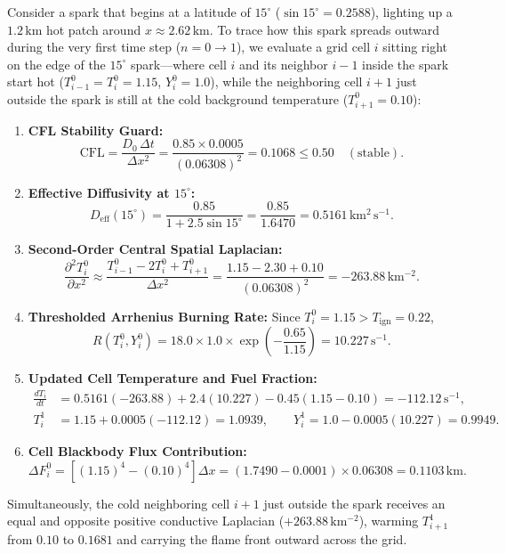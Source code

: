 \documentclass[11pt,a4paper]{article}
\begin{document}
Consider a spark that begins at a latitude of $15^\circ$ ($\sin 15^\circ = 0.2588$), lighting up a $1.2\,\mathrm{km}$ hot patch around $x \approx 2.62\,\mathrm{km}$. To trace how this spark spreads outward during the very first time step ($n = 0 \to 1$), we evaluate a grid cell $i$ sitting right on the edge of the $15^\circ$ spark—where cell $i$ and its neighbor $i-1$ inside the spark start hot ($T_{i-1}^0 = T_i^0 = 1.15$, $Y_i^0 = 1.0$), while the neighboring cell $i+1$ just outside the spark is still at the cold background temperature ($T_{i+1}^0 = 0.10$):
\begin{enumerate}
    \item \textbf{CFL Stability Guard:}
    \begin{equation*}
        \mathrm{CFL} = \frac{D_0\,\Delta t}{\Delta x^2} = \frac{0.85 \times 0.0005}{(0.06308)^2} = 0.1068 \le 0.50 \quad (\text{stable}).
    \end{equation*}
    \item \textbf{Effective Diffusivity at $15^\circ$:}
    \begin{equation*}
        D_{\mathrm{eff}}(15^\circ) = \frac{0.85}{1 + 2.5 \sin 15^\circ} = \frac{0.85}{1.6470} = 0.5161\,\mathrm{km^2\,s^{-1}}.
    \end{equation*}
    \item \textbf{Second-Order Central Spatial Laplacian:}
    \begin{equation*}
        \frac{\partial^2 T_i^0}{\partial x^2} \approx \frac{T_{i-1}^0 - 2T_i^0 + T_{i+1}^0}{\Delta x^2} = \frac{1.15 - 2.30 + 0.10}{(0.06308)^2} = -263.88\,\mathrm{km^{-2}}.
    \end{equation*}
    \item \textbf{Thresholded Arrhenius Burning Rate:} Since $T_i^0 = 1.15 > T_{\mathrm{ign}} = 0.22$,
    \begin{equation*}
        R(T_i^0, Y_i^0) = 18.0 \times 1.0 \times \exp\!\left(-\frac{0.65}{1.15}\right) = 10.227\,\mathrm{s^{-1}}.
    \end{equation*}
    \item \textbf{Updated Cell Temperature and Fuel Fraction:}
    \begin{align*}
        \frac{dT_i}{dt} &= 0.5161(-263.88) + 2.4(10.227) - 0.45(1.15 - 0.10) = -112.12\,\mathrm{s^{-1}}, \\
        T_i^1 &= 1.15 + 0.0005(-112.12) = 1.0939, \qquad Y_i^1 = 1.0 - 0.0005(10.227) = 0.9949.
    \end{align*}
    \item \textbf{Cell Blackbody Flux Contribution:}
    \begin{equation*}
        \Delta F_i^0 = \left[(1.15)^4 - (0.10)^4\right]\Delta x = (1.7490 - 0.0001) \times 0.06308 = 0.1103\,\mathrm{km}.
    \end{equation*}
\end{enumerate}
Simultaneously, the cold neighboring cell $i+1$ just outside the spark receives an equal and opposite positive conductive Laplacian ($+263.88\,\mathrm{km^{-2}}$), warming $T_{i+1}^1$ from $0.10$ to $0.1681$ and carrying the flame front outward across the grid.
\end{document}
